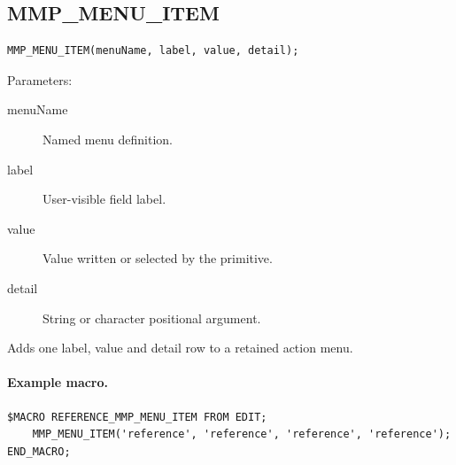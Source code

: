 \documentclass[a4paper,10pt,twoside,openany]{book}
\newenvironment{mrmacextension}{\begin{changebar}}{\end{changebar}}
\begin{document}
\begin{mrmacextension}
\label{prim:procedure-mmp-menu-item}
\subsection*{MMP\_MENU\_ITEM}
\begin{verbatim}
MMP_MENU_ITEM(menuName, label, value, detail);
\end{verbatim}
Parameters:
\begin{description}
\item[menuName] Named menu definition.
\item[label] User-visible field label.
\item[value] Value written or selected by the primitive.
\item[detail] String or character positional argument.
\end{description}

Adds one label, value and detail row to a retained action menu.

\paragraph{Example macro.}
\begin{verbatim}
$MACRO REFERENCE_MMP_MENU_ITEM FROM EDIT;
    MMP_MENU_ITEM('reference', 'reference', 'reference', 'reference');
END_MACRO;
\end{verbatim}
\end{mrmacextension}
\end{document}
